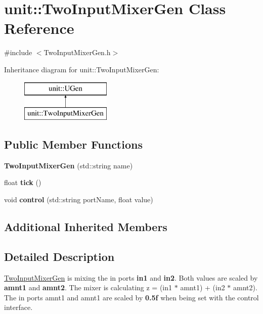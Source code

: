 \hypertarget{classunit_1_1TwoInputMixerGen}{}\section{unit\+:\+:Two\+Input\+Mixer\+Gen Class Reference}
\label{classunit_1_1TwoInputMixerGen}


{\ttfamily \#include $<$Two\+Input\+Mixer\+Gen.\+h$>$}

Inheritance diagram for unit\+:\+:Two\+Input\+Mixer\+Gen\+:\begin{figure}[H]
\begin{center}
\leavevmode
\includegraphics[height=2.000000cm]{classunit_1_1TwoInputMixerGen}
\end{center}
\end{figure}
\subsection*{Public Member Functions}
\begin{DoxyCompactItemize}
\item 
{\bfseries Two\+Input\+Mixer\+Gen} (std\+::string name)\hypertarget{classunit_1_1TwoInputMixerGen_ae150f51a934ffb7330f8a2852b094539}{}\label{classunit_1_1TwoInputMixerGen_ae150f51a934ffb7330f8a2852b094539}

\item 
float {\bfseries tick} ()\hypertarget{classunit_1_1TwoInputMixerGen_aef96ef6828e767384a8881d108c0d52b}{}\label{classunit_1_1TwoInputMixerGen_aef96ef6828e767384a8881d108c0d52b}

\item 
void {\bfseries control} (std\+::string port\+Name, float value)\hypertarget{classunit_1_1TwoInputMixerGen_ab8d7d00eb0c692a8c2de706f58673d3d}{}\label{classunit_1_1TwoInputMixerGen_ab8d7d00eb0c692a8c2de706f58673d3d}

\end{DoxyCompactItemize}
\subsection*{Additional Inherited Members}


\subsection{Detailed Description}
\hyperlink{classunit_1_1TwoInputMixerGen}{Two\+Input\+Mixer\+Gen} is mixing the in ports {\bfseries in1} and {\bfseries in2}. Both values are scaled by {\bfseries amnt1} and {\bfseries amnt2}. The mixer is calculating z = (in1 $\ast$ amnt1) + (in2 $\ast$ amnt2). The in ports amnt1 and amnt1 are scaled by {\bfseries 0.\+5f} when being set with the control interface.


